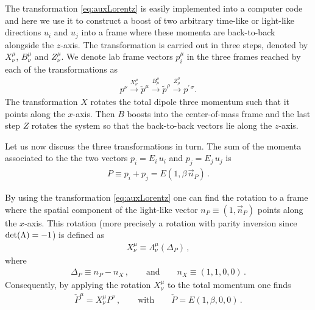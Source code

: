 \documentclass[11pt,a4paper]{article}
\begin{document}
The transformation \eqref{eq:auxLorentz} is easily implemented into a computer code and here we use it to construct a boost of two arbitrary time-like or light-like directions $u_i$ and $u_j$ into a frame where these momenta are back-to-back alongside the $z$-axis. The transformation is carried out in three steps, denoted by $X^\mu_\nu$, $B^\mu_\nu$ and $Z^\mu_\nu$. We denote  lab frame vectors $p_i^\mu$ in the three frames reached by each of the transformations  as 
\begin{align}
	p^\nu \stackrel{X^\mu_\nu}{\longrightarrow}\check{ p }^\mu \stackrel{B^\rho_\mu}{\longrightarrow} \tilde{p}^\rho\stackrel{Z^\sigma_\rho}{\longrightarrow} p^{\prime\,\sigma}. \label{eq:deltatrans}
\end{align}
The transformation $X$ rotates the total dipole three momentum such that it points along the $x$-axis. Then $B$ boosts into the center-of-mass frame and the last step $Z$ rotates the system so that the back-to-back vectors lie along the $z$-axis.

Let us now discuss the three transformations in turn. The sum of the momenta associated to the the two vectors $p_i = E_i \,u_i$  and $p_j = E_j \,u_j$  is 
\begin{align}\label{eq:totMom}
	P \equiv p_i + p_j 
   = E (1,\beta\,  \vec{n}_P) \, .
\end{align}

By using the transformation \eqref{eq:auxLorentz} one can find the rotation to a frame where the spatial component of the light-like  vector $ n_P \equiv (1,\vec{n}_P)$ points along the $x$-axis. This rotation (more precisely a rotation with parity inversion since ${\rm det}(\Lambda)=-1$) is defined as 
\begin{align}
X_\nu^\mu\equiv\Lambda_\nu^\mu\left(\Delta_P\right)\, ,
\end{align}
where 
\begin{align}
\Delta_P \equiv n_P - n_X \, , \qquad \text{and} \qquad n_X \equiv (1,1,0,0) \, .
\end{align}
Consequently, by applying the rotation $X^{\mu}_\nu$ to the total momentum one finds
\begin{align}
\check{P}^\mu =X^{\mu}_\nu P^\nu \, , \qquad \text{with} \qquad \check{P} = E (1, \beta ,0,0) \, .  \label{eq:Xrot}
\end{align}
\end{document}
